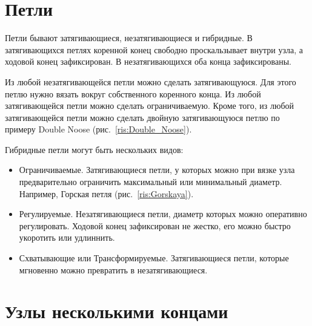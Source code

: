 \documentclass{book}
\begin{document}






\chapter{Петли}

Петли бывают затягивающиеся, незатягивающиеся и гибридные. В затягивающихся петлях коренной конец свободно проскальзывает внутри узла, а ходовой конец зафиксирован. В незатягивающихся оба конца зафиксированы.

Из любой незатягивающейся петли можно сделать затягивающуюся. Для этого петлю нужно вязать вокруг собственного коренного конца. Из любой затягивающейся петли можно сделать ограничиваемую. Кроме того, из любой затягивающейся петли можно сделать двойную затягивающуюся петлю по примеру Double Noose (рис.~\ref{ris:Double_Noose}).

Гибридные петли могут быть нескольких видов:

\begin{itemize}
\item Ограничиваемые. Затягивающиеся петли, у которых можно при вязке узла предварительно ограничить максимальный или минимальный диаметр. Например, Горская петля (рис.~\ref{ris:Gorskaya}).
\item Регулируемые. Незатягивающиеся петли, диаметр которых можно оперативно регулировать. Ходовой конец зафиксирован не жестко, его можно быстро укоротить или удлиннить.
\item Схватывающие или Трансформируемые. Затягивающиеся петли, которые мгновенно можно превратить в незатягивающиеся.
\end{itemize}






 








\chapter{Узлы несколькими концами}
\end{document}
